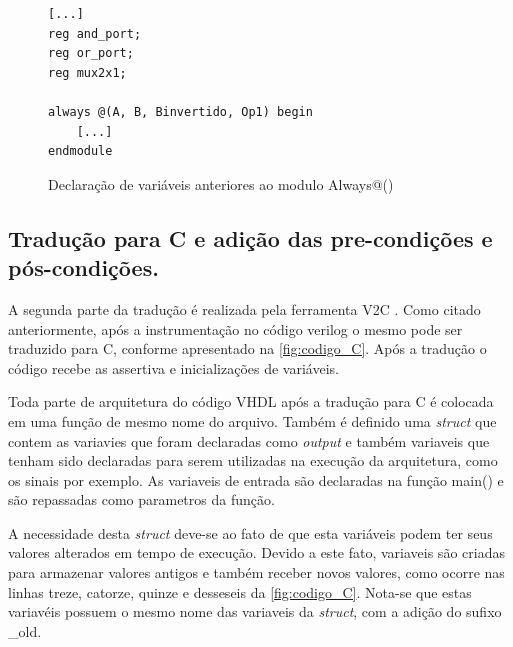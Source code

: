 \begin{figure}[H]
\caption{\label{fig:codigo_verilog_always} Declaração de variáveis anteriores ao modulo Always@()}
	\begin{center}
    \begin{minipage}{0.7\textwidth}
    \begin{lstlisting}
[...]
reg and_port;
reg or_port;
reg mux2x1;

always @(A, B, Binvertido, Op1) begin
    [...]
endmodule
    \end{lstlisting}
    \end{minipage}
	\end{center}
\end{figure}

\par

\subsection{Tradução para C e adição das pre-condições e pós-condições.}

\par
A segunda parte da tradução é realizada pela ferramenta V2C \cite{mukherjee2016v2c}. Como citado anteriormente, após a instrumentação no código verilog o mesmo pode ser traduzido para C, conforme apresentado na \autoref{fig:codigo_C}. Após a tradução o código recebe as assertiva e inicializações de variáveis.

\par
Toda parte de arquitetura do código VHDL após a tradução para C é colocada em uma função de mesmo nome do arquivo. Também é definido uma \textit{struct} que contem as variavies que foram declaradas como \textit{output} e também variaveis que tenham sido declaradas para serem
utilizadas na execução da arquitetura, como os sinais por exemplo. As variaveis de entrada são declaradas na função main() e são repassadas como parametros da função.

\par
A necessidade desta \textit{struct} deve-se ao fato de que esta variáveis podem ter seus valores alterados em tempo de execução. Devido a este fato, variaveis são criadas para armazenar valores antigos e também receber novos valores, como ocorre nas linhas treze, catorze, quinze e desseseis da \autoref{fig:codigo_C}. Nota-se que estas variavéis possuem o mesmo nome das variaveis da \textit{struct}, com a adição do sufixo \_old.

